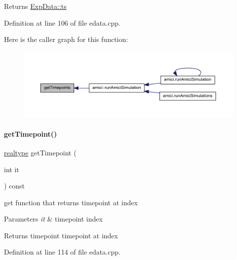 \begin{DoxyReturn}{Returns}
\mbox{\hyperlink{classamici_1_1_exp_data_aa7014a80e7b102f85a10e3b9a480e8e5}{Exp\+Data\+::ts}} 
\end{DoxyReturn}


Definition at line 106 of file edata.\+cpp.

Here is the caller graph for this function\+:
\nopagebreak
\begin{figure}[H]
\begin{center}
\leavevmode
\includegraphics[width=350pt]{classamici_1_1_exp_data_a50ea5198d117f8f4ad1e34bb279975c8_icgraph}
\end{center}
\end{figure}
\mbox{\label{classamici_1_1_exp_data_abee92d90cb7fe75fa39fb98c2ab0fd0a}} 
\paragraph{\texorpdfstring{get\+Timepoint()}{getTimepoint()}}
{\footnotesize\ttfamily \mbox{\hyperlink{namespaceamici_a1bdce28051d6a53868f7ccbf5f2c14a3}{realtype}} get\+Timepoint (\begin{DoxyParamCaption}\item[{int}]{it }\end{DoxyParamCaption}) const}

get function that returns timepoint at index


\begin{DoxyParams}{Parameters}
{\em it} & timepoint index \\
\hline
\end{DoxyParams}
\begin{DoxyReturn}{Returns}
timepoint timepoint at index 
\end{DoxyReturn}


Definition at line 114 of file edata.\+cpp.

